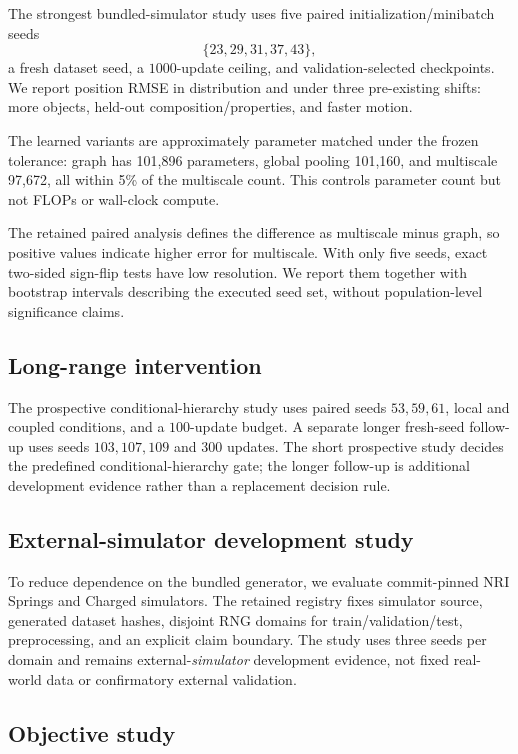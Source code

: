 \documentclass[10pt]{article}
\begin{document}
The strongest bundled-simulator study uses five paired initialization/minibatch seeds
\[
\{23,29,31,37,43\},
\]
a fresh dataset seed, a $1000$-update ceiling, and validation-selected checkpoints. We report position RMSE in distribution and under three pre-existing shifts: more objects, held-out composition/properties, and faster motion.

The learned variants are approximately parameter matched under the frozen tolerance: graph has 101,896 parameters, global pooling 101,160, and multiscale 97,672, all within 5\% of the multiscale count. This controls parameter count but not FLOPs or wall-clock compute.

The retained paired analysis defines the difference as multiscale minus graph, so positive values indicate higher error for multiscale. With only five seeds, exact two-sided sign-flip tests have low resolution. We report them together with bootstrap intervals describing the executed seed set, without population-level significance claims.

\subsection{Long-range intervention}

The prospective conditional-hierarchy study uses paired seeds $53,59,61$, local and coupled conditions, and a $100$-update budget. A separate longer fresh-seed follow-up uses seeds $103,107,109$ and $300$ updates. The short prospective study decides the predefined conditional-hierarchy gate; the longer follow-up is additional development evidence rather than a replacement decision rule.

\subsection{External-simulator development study}

To reduce dependence on the bundled generator, we evaluate commit-pinned NRI Springs and Charged simulators. The retained registry fixes simulator source, generated dataset hashes, disjoint RNG domains for train/validation/test, preprocessing, and an explicit claim boundary. The study uses three seeds per domain and remains external-\emph{simulator} development evidence, not fixed real-world data or confirmatory external validation.

\subsection{Objective study}
\end{document}
